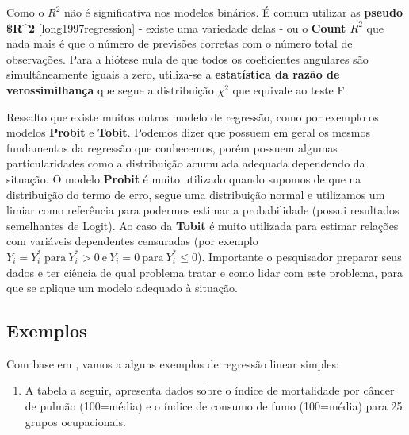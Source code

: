 \documentclass[
]{book}
\providecommand{\tightlist}{%
  \setlength{\itemsep}{0pt}\setlength{\parskip}{0pt}}
\begin{document}
Como o \(R^2\) não é significativa nos modelos binários. É comum utilizar as \textbf{pseudo \$R\^{}2} {[}long1997regression{]} - existe uma variedade delas - ou o \textbf{Count \(R^2\)} que nada mais é que o número de previsões corretas com o número total de observações. Para a hiótese nula de que todos os coeficientes angulares são simultâneamente iguais a zero, utiliza-se a \textbf{estatística da razão de verossimilhança} que segue a distribuição \(\chi^2\) que equivale ao teste F.

Ressalto que existe muitos outros modelo de regressão, como por exemplo os modelos \textbf{Probit} e \textbf{Tobit}. Podemos dizer que possuem em geral os mesmos fundamentos da regressão que conhecemos, porém possuem algumas particularidades como a distribuição acumulada adequada dependendo da situação. O modelo \textbf{Probit} é muito utilizado quando supomos de que na distribuição do termo de erro, segue uma distribuição normal e utilizamos um limiar como referência para podermos estimar a probabilidade (possui resultados semelhantes de Logit). Ao caso da \textbf{Tobit} é muito utilizada para estimar relações com variáveis dependentes censuradas (por exemplo \(Y_i=Y_i^* \ \mbox{para} \ Y_i^* > 0 \ \mbox{e} \ Y_i=0 \ \mbox{para} \ Y_i^*\leq 0\)). Importante o pesquisador preparar seus dados e ter ciência de qual problema tratar e como lidar com este problema, para que se aplique um modelo adequado à situação.

\hypertarget{exemplo1reg}{%
\subsection{Exemplos}\label{exemplo1reg}}

Com base em \citet{morettin2017estatistica}, vamos a alguns exemplos de regressão linear simples:

\begin{enumerate}
\def\labelenumi{\arabic{enumi}.}
\tightlist
\item
  A tabela a seguir, apresenta dados sobre o índice de mortalidade por câncer de pulmão (100=média) e o índice de consumo de fumo (100=média) para 25 grupos ocupacionais.
\end{enumerate}
\end{document}
